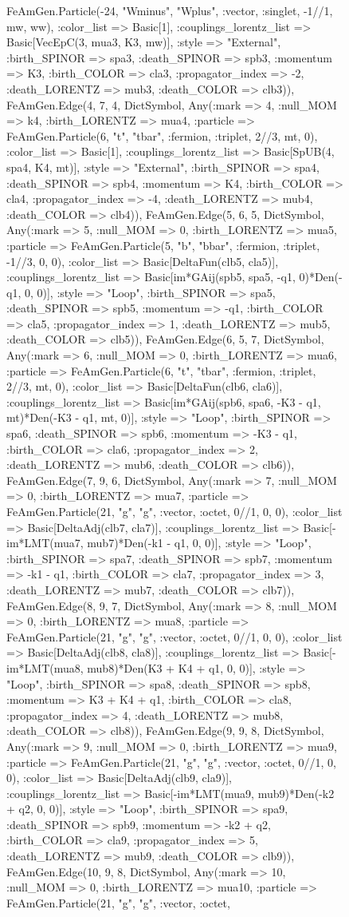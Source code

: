 \documentclass{revtex4}
\begin{document}
\begin{figure}[!htb]
\begin{center}
{FeAmGen.Particle(-24, "Wminus", "Wplus", :vector, :singlet, -1//1, mw, ww), :color_list => Basic[1], :couplings_lorentz_list => Basic[VecEpC(3, mua3, K3, mw)], :style => "External", :birth_SPINOR => spa3, :death_SPINOR => spb3, :momentum => K3, :birth_COLOR => cla3, :propagator_index => -2, :death_LORENTZ => mub3, :death_COLOR => clb3)), FeAmGen.Edge(4, 7, 4, Dict{Symbol, Any}(:mark => 4, :null_MOM => k4, :birth_LORENTZ => mua4, :particle => FeAmGen.Particle(6, "t", "tbar", :fermion, :triplet, 2//3, mt, 0), :color_list => Basic[1], :couplings_lorentz_list => Basic[SpUB(4, spa4, K4, mt)], :style => "External", :birth_SPINOR => spa4, :death_SPINOR => spb4, :momentum => K4, :birth_COLOR => cla4, :propagator_index => -4, :death_LORENTZ => mub4, :death_COLOR => clb4)), FeAmGen.Edge(5, 6, 5, Dict{Symbol, Any}(:mark => 5, :null_MOM => 0, :birth_LORENTZ => mua5, :particle => FeAmGen.Particle(5, "b", "bbar", :fermion, :triplet, -1//3, 0, 0), :color_list => Basic[DeltaFun(clb5, cla5)], :couplings_lorentz_list => Basic[im*GAij(spb5, spa5, -q1, 0)*Den(-q1, 0, 0)], :style => "Loop", :birth_SPINOR => spa5, :death_SPINOR => spb5, :momentum => -q1, :birth_COLOR => cla5, :propagator_index => 1, :death_LORENTZ => mub5, :death_COLOR => clb5)), FeAmGen.Edge(6, 5, 7, Dict{Symbol, Any}(:mark => 6, :null_MOM => 0, :birth_LORENTZ => mua6, :particle => FeAmGen.Particle(6, "t", "tbar", :fermion, :triplet, 2//3, mt, 0), :color_list => Basic[DeltaFun(clb6, cla6)], :couplings_lorentz_list => Basic[im*GAij(spb6, spa6, -K3 - q1, mt)*Den(-K3 - q1, mt, 0)], :style => "Loop", :birth_SPINOR => spa6, :death_SPINOR => spb6, :momentum => -K3 - q1, :birth_COLOR => cla6, :propagator_index => 2, :death_LORENTZ => mub6, :death_COLOR => clb6)), FeAmGen.Edge(7, 9, 6, Dict{Symbol, Any}(:mark => 7, :null_MOM => 0, :birth_LORENTZ => mua7, :particle => FeAmGen.Particle(21, "g", "g", :vector, :octet, 0//1, 0, 0), :color_list => Basic[DeltaAdj(clb7, cla7)], :couplings_lorentz_list => Basic[-im*LMT(mua7, mub7)*Den(-k1 - q1, 0, 0)], :style => "Loop", :birth_SPINOR => spa7, :death_SPINOR => spb7, :momentum => -k1 - q1, :birth_COLOR => cla7, :propagator_index => 3, :death_LORENTZ => mub7, :death_COLOR => clb7)), FeAmGen.Edge(8, 9, 7, Dict{Symbol, Any}(:mark => 8, :null_MOM => 0, :birth_LORENTZ => mua8, :particle => FeAmGen.Particle(21, "g", "g", :vector, :octet, 0//1, 0, 0), :color_list => Basic[DeltaAdj(clb8, cla8)], :couplings_lorentz_list => Basic[-im*LMT(mua8, mub8)*Den(K3 + K4 + q1, 0, 0)], :style => "Loop", :birth_SPINOR => spa8, :death_SPINOR => spb8, :momentum => K3 + K4 + q1, :birth_COLOR => cla8, :propagator_index => 4, :death_LORENTZ => mub8, :death_COLOR => clb8)), FeAmGen.Edge(9, 9, 8, Dict{Symbol, Any}(:mark => 9, :null_MOM => 0, :birth_LORENTZ => mua9, :particle => FeAmGen.Particle(21, "g", "g", :vector, :octet, 0//1, 0, 0), :color_list => Basic[DeltaAdj(clb9, cla9)], :couplings_lorentz_list => Basic[-im*LMT(mua9, mub9)*Den(-k2 + q2, 0, 0)], :style => "Loop", :birth_SPINOR => spa9, :death_SPINOR => spb9, :momentum => -k2 + q2, :birth_COLOR => cla9, :propagator_index => 5, :death_LORENTZ => mub9, :death_COLOR => clb9)), FeAmGen.Edge(10, 9, 8, Dict{Symbol, Any}(:mark => 10, :null_MOM => 0, :birth_LORENTZ => mua10, :particle => FeAmGen.Particle(21, "g", "g", :vector, :octet, }
\end{center}
\end{figure}
\end{document}
